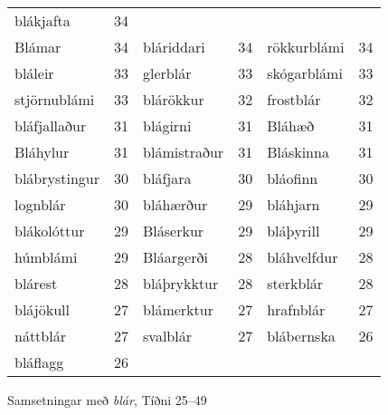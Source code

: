 \documentclass[../samsetningasafn.tex]{subfiles}
\begin{document}
\begin{wordlist}[H]
\begin{tcolorbox}
\begin{tabular}{BlBlBl}
		blákjafta	& 34		\\ 
		Blámar		& 34		& 	
		bláriddari	& 34		& 	
		rökkurblámi	& 34		\\ 	
		bláleir		& 33		& 	
		glerblár		& 33		& 	
		skógarblámi	& 33		\\ 	
		stjörnublámi	& 33		& 	
		blárökkur	& 32		& 		
		frostblár		& 32		\\ 	
		bláfjallaður	& 31		& 
		blágirni		& 31		& 	
		Bláhæð		& 31		\\ 	
		Bláhylur		& 31		& 		
		blámistraður & 31		& 
		Bláskinna	& 31		\\ 	
		blábrystingur & 30		& 	
		bláfjara		& 30		& 	
		bláofinn		& 30		\\ 	
		lognblár		& 30		& 
		bláhærður	& 29		& 	
		bláhjarn		& 29		\\ 	
		blákolóttur	& 29		& 	
		Bláserkur	& 29		& 	
		bláþyrill		& 29		\\ 
		húmblámi	& 29		& 	
		Bláargerði	& 28		& 	
		bláhvelfdur	& 28		\\ 	
		blárest		& 28		& 
		bláþrykktur	& 28		& 	
		sterkblár	& 28		\\ 	
		blájökull		& 27		& 	
		blámerktur	& 27		& 	
		hrafnblár	& 27		\\ 		
		náttblár		& 27		& 
		svalblár		& 27		& 
		blábernska	& 26		\\ 
		bláflagg		& 26		& 		
					& 			&
					&
	\end{tabular}

\end{tcolorbox}
	\caption{Samsetningar með \textit{blár}, Tíðni 25--49}
	\label{listi:blatt.25}
\end{wordlist}
\end{document}

